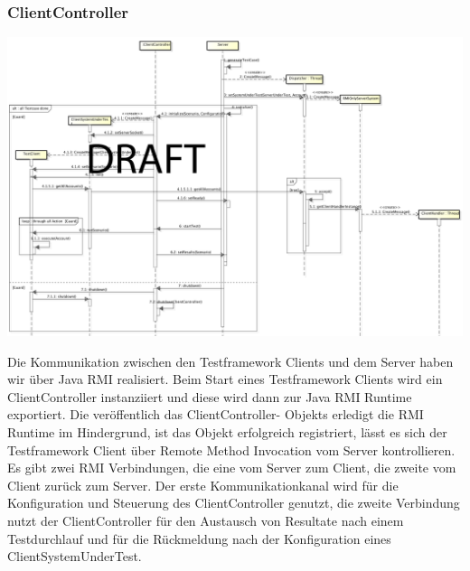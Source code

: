 \subsubsection{ClientController}
\label{sec:clientController}

\begin{center}
\includegraphics[scale=0.3]{image_testFramework/TestFWServerClientSeq.png}
\end{center}
 
Die Kommunikation zwischen den Testframework Clients und dem Server haben wir über Java RMI realisiert. Beim Start eines Testframework Clients wird ein ClientController instanziiert und diese wird dann zur Java RMI Runtime exportiert. Die veröffentlich das ClientController- Objekts erledigt die RMI Runtime im Hindergrund, ist das Objekt erfolgreich registriert, lässt es sich der Testframework Client über Remote Method Invocation vom Server kontrollieren. Es gibt zwei RMI Verbindungen, die eine vom Server zum Client, die zweite vom Client zurück zum Server. Der erste Kommunikationkanal wird für die Konfiguration und Steuerung des ClientController genutzt, die zweite Verbindung nutzt der ClientController für den Austausch von Resultate nach einem Testdurchlauf und für die Rückmeldung nach der Konfiguration eines ClientSystemUnderTest.

